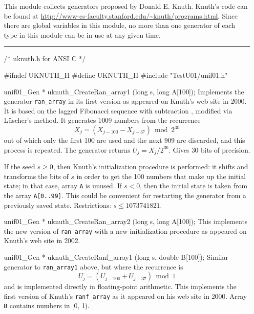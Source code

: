 
This module collects generators proposed by Donald E. Knuth. 
Knuth's code can be found at
\url{http://www-cs-faculty.stanford.edu/~knuth/programs.html}.
Since there are global variables in this module, no more than
one generator of each type  in this module can be in use at any given
time. 


\bigskip
\hrule
\code
\hide
/* uknuth.h for ANSI C */

#ifndef UKNUTH_H
#define UKNUTH_H
\endhide
#include "TestU01/unif01.h"


unif01_Gen * uknuth_CreateRan_array1 (long s, long A[100]);
\endcode
  \tab  Implements the generator {\tt ran\_array} in its first version as
  appeared on Knuth's web site in 2000. It is
  based on the lagged Fibonacci sequence with
  subtraction \cite{rKNU98a}, modified via L\"uscher's method.
  It generates 1009 numbers from the recurrence
  $$
   X_j = (X_{j-100} - X_{j-37}) \bmod 2^{30}
  $$
  out of which only the first 100 are used and the
  next 909 are discarded, and this process is repeated.
  The generator returns $U_j = X_j/2^{30}$. 
  Gives 30 bits of precision.

  If the seed $s \ge 0$, then Knuth's initialization procedure
  is performed: it shifts and transforms the bits of $s$  in order to get
  the 100 numbers that make up the initial state; in that case, 
  array {\tt A} is unused.
  If  $s < 0$, then the initial state is taken from the array
  {\tt A[0..99]}.  This could be convenient for restarting the
  generator from a previously saved state.
  Restrictions: $s \le 1073741821$.
 \endtab
\code


unif01_Gen * uknuth_CreateRan_array2 (long s, long A[100]);
\endcode
  \tab 
   This implements the new version of {\tt ran\_array} with a new
  initialization procedure as appeared on Knuth's web site in 2002. 
 \endtab
\code


unif01_Gen * uknuth_CreateRanf_array1 (long s, double B[100]);
\endcode
  \tab Similar generator to {\tt ran\_array1} above, but 
   where the recurrence is 
   $$
    U_j = (U_{j-100} + U_{j-37}) \bmod 1
   $$
   and is  implemented directly in floating-point arithmetic.
   This implements the first version of Knuth's 
    {\tt ranf\_array} as it
%
   appeared on his web site in 2000. Array {\tt B} contains
  numbers in [0, 1).
  \endtab
\code


